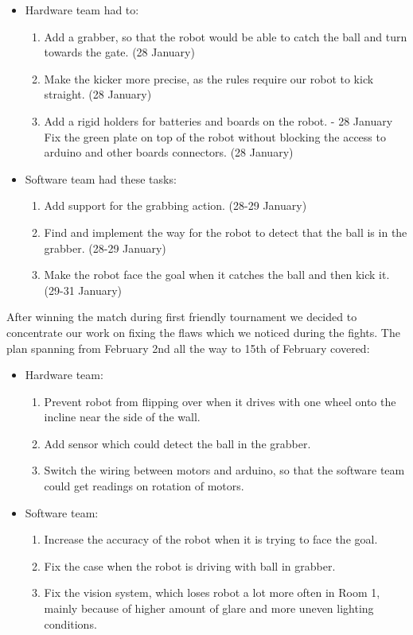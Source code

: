 \documentclass[12pt,oneside]{article}
\begin{document}
			\begin{itemize}
				\item Hardware team had to:
				\begin{enumerate}
					\item Add a grabber, so that the robot would be able to catch the ball and turn towards the gate. (28 January)
					\item Make the kicker more precise, as the rules require our robot to kick straight. (28 January)
					\item Add a rigid holders for batteries and boards on the robot. - 28 January
					Fix the green plate on top of the robot without blocking the access to arduino and other boards connectors. (28 January)
				\end{enumerate}
				\item Software team had these tasks:
				\begin{enumerate}
					\item Add support for the grabbing action. (28-29 January)
					\item Find and implement the way for the robot to detect that the ball is in the grabber. (28-29 January)
					\item Make the robot face the goal when it catches the ball and then kick it. (29-31 January)
				\end{enumerate}
			\end{itemize}
			After winning the match during first friendly tournament we decided to concentrate our work on fixing the flaws which we noticed during the fights. The plan spanning from February 2nd all the way to 15th of February covered:
			\begin{itemize}
				\item Hardware team:
				\begin{enumerate}
					\item Prevent robot from flipping over when it drives with one wheel onto the incline near the side of the wall.
					\item Add sensor which could detect the ball in the grabber.
					\item Switch the wiring between motors and arduino, so that the software team could get readings on rotation of motors.
				\end{enumerate}
				\item Software team:
				\begin{enumerate}
					\item Increase the accuracy of the robot when it is trying to face the goal.
					\item Fix the case when the robot is driving with ball in grabber.
					\item Fix the vision system, which loses robot a lot more often in Room 1, mainly because of higher amount of glare and more uneven lighting conditions.
				\end{enumerate}
			\end{itemize}
\end{document}
